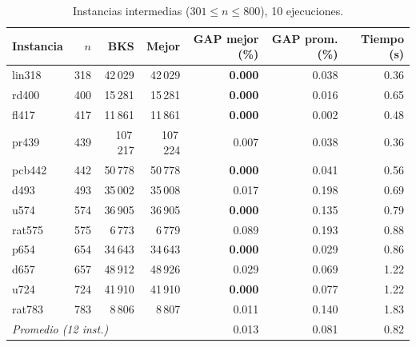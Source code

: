 \documentclass[runningheads]{llncs}
\begin{document}
\begin{table}
\caption{Instancias intermedias ($301\le n\le 800$), 10 ejecuciones.}
\label{tab:inter}
\centering\scriptsize
\begin{tabular}{@{}lrrrrrr@{}}
\toprule
\textbf{Instancia} & $n$ & \textbf{BKS} & \textbf{Mejor} & \textbf{GAP mejor (\%)} & \textbf{GAP prom. (\%)} & \textbf{Tiempo (s)}\\
\midrule
lin318 & 318 & 42\,029 & 42\,029 & \textbf{0.000} & 0.038 & 0.36 \\
rd400 & 400 & 15\,281 & 15\,281 & \textbf{0.000} & 0.016 & 0.65 \\
fl417 & 417 & 11\,861 & 11\,861 & \textbf{0.000} & 0.002 & 0.48 \\
pr439 & 439 & 107\,217 & 107\,224 & 0.007 & 0.038 & 0.36 \\
pcb442 & 442 & 50\,778 & 50\,778 & \textbf{0.000} & 0.041 & 0.56 \\
d493 & 493 & 35\,002 & 35\,008 & 0.017 & 0.198 & 0.69 \\
u574 & 574 & 36\,905 & 36\,905 & \textbf{0.000} & 0.135 & 0.79 \\
rat575 & 575 & 6\,773 & 6\,779 & 0.089 & 0.193 & 0.88 \\
p654 & 654 & 34\,643 & 34\,643 & \textbf{0.000} & 0.029 & 0.86 \\
d657 & 657 & 48\,912 & 48\,926 & 0.029 & 0.069 & 1.22 \\
u724 & 724 & 41\,910 & 41\,910 & \textbf{0.000} & 0.077 & 1.22 \\
rat783 & 783 & 8\,806 & 8\,807 & 0.011 & 0.140 & 1.83 \\
\midrule
\multicolumn{4}{l}{\textit{Promedio (12 inst.)}} & 0.013 & 0.081 & 0.82 \\
\bottomrule
\end{tabular}
\end{table}
\end{document}

